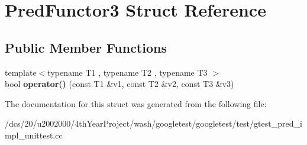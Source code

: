 \hypertarget{structPredFunctor3}{}\section{Pred\+Functor3 Struct Reference}
\label{structPredFunctor3}
\subsection*{Public Member Functions}
\begin{DoxyCompactItemize}
\item 
\mbox{\label{structPredFunctor3_a08b0c59189570fb8eb7e2c7452fec995}} 
{\footnotesize template$<$typename T1 , typename T2 , typename T3 $>$ }\\bool {\bfseries operator()} (const T1 \&v1, const T2 \&v2, const T3 \&v3)
\end{DoxyCompactItemize}


The documentation for this struct was generated from the following file\+:\begin{DoxyCompactItemize}
\item 
/dcs/20/u2002000/4th\+Year\+Project/wash/googletest/googletest/test/gtest\+\_\+pred\+\_\+impl\+\_\+unittest.\+cc\end{DoxyCompactItemize}

